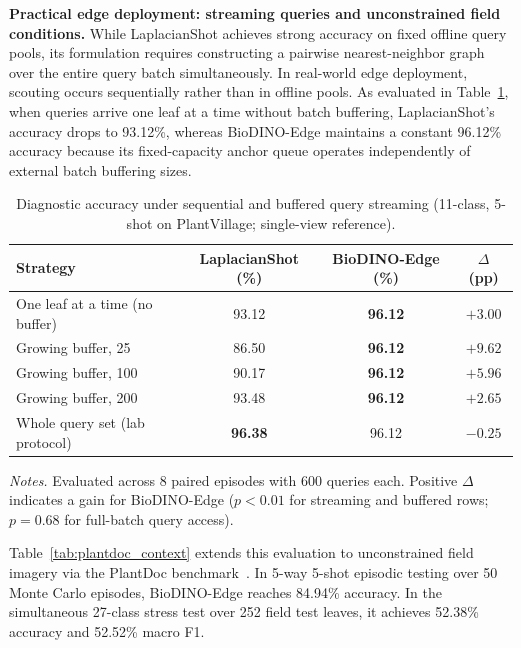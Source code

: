 \documentclass[preprint,12pt]{elsarticle}
\begin{document}
\textbf{Practical edge deployment: streaming queries and unconstrained field conditions.} While LaplacianShot achieves strong accuracy on fixed offline query pools, its formulation requires constructing a pairwise nearest-neighbor graph over the entire query batch simultaneously. In real-world edge deployment, scouting occurs sequentially rather than in offline pools. As evaluated in Table~\ref{tab:batchsize}, when queries arrive one leaf at a time without batch buffering, LaplacianShot's accuracy drops to 93.12\%, whereas BioDINO-Edge maintains a constant 96.12\% accuracy because its fixed-capacity anchor queue operates independently of external batch buffering sizes.

\begin{table}[htbp]
\caption{Diagnostic accuracy under sequential and buffered query streaming (11-class, 5-shot on PlantVillage; single-view reference).}
\label{tab:batchsize}
\centering

\footnotesize
\setlength{\tabcolsep}{4pt}
\begin{tabular*}{\columnwidth}{@{\extracolsep{\fill}}lccc}
\toprule
\textbf{Strategy} & \textbf{LaplacianShot (\%)} & \textbf{BioDINO-Edge (\%)} & \textbf{$\Delta$ (pp)} \\
\midrule
One leaf at a time (no buffer) & 93.12 & \textbf{96.12} & $+3.00$ \\
Growing buffer, 25 & 86.50 & \textbf{96.12} & $+9.62$ \\
Growing buffer, 100 & 90.17 & \textbf{96.12} & $+5.96$ \\
Growing buffer, 200 & 93.48 & \textbf{96.12} & $+2.65$ \\
Whole query set (lab protocol) & \textbf{96.38} & 96.12 & $-0.25$ \\
\bottomrule
\end{tabular*}

\vspace{3pt}
\begin{minipage}{\columnwidth}
\footnotesize
\textit{Notes.} Evaluated across 8 paired episodes with 600 queries each. Positive $\Delta$ indicates a gain for BioDINO-Edge ($p < 0.01$ for streaming and buffered rows; $p = 0.68$ for full-batch query access).
\end{minipage}
\end{table}

Table~\ref{tab:plantdoc_context} extends this evaluation to unconstrained field imagery via the PlantDoc benchmark~\cite{singh2020plantdoc}. In 5-way 5-shot episodic testing over 50 Monte Carlo episodes, BioDINO-Edge reaches 84.94\% accuracy. In the simultaneous 27-class stress test over 252 field test leaves, it achieves 52.38\% accuracy and 52.52\% macro F1.
\end{document}
